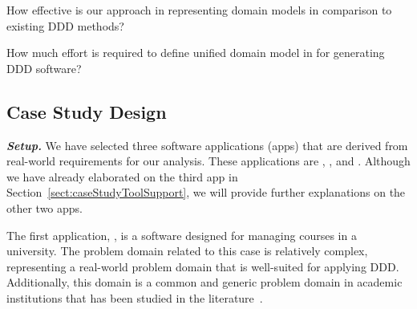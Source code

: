 \begin{description}[labelindent=0.5cm,leftmargin=0.5cm]
%
\item[\textbf{RQ1.}] %
How effective is our approach in representing domain models in comparison to existing DDD methods?
%
\item[\textbf{RQ2.}] How much effort is required to define unified domain model in \agldcsl for generating DDD software?
%
%
\end{description}
 
\subsection{Case Study Design}
\label{subsect:caseDesign} 

\noindent \textit{\textbf{Setup.}} 
We have selected three software applications (apps) that are derived from real-world requirements for our analysis. These applications are \courseman, \processman, and \orderman. Although we have already elaborated on the third app in Section~\ref{sect:caseStudyToolSupport}, we will provide further explanations on the other two apps.

The first application, \courseman, is a software designed for managing courses in a university. The problem domain related to this case is relatively complex, representing a real-world problem domain that is well-suited for applying DDD. Additionally, this domain is a common and generic problem domain in academic institutions that has been studied in the literature~\cite{ajanovskiIntegrationCourseEnrolment2013,omahonyRecommenderSystemOnline2007,le_domain_2018}.

